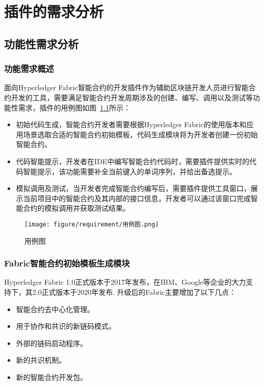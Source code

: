 \chapter{插件的需求分析}

\section{功能性需求分析}

\subsection{功能需求概述}

面向Hyperledger Fabric智能合约的开发插件作为辅助区块链开发人员进行智能合约开发的工具，需要满足智能合约开发周期涉及的创建、编写、调用以及测试等功能性需求，插件的用例图如图~\ref{fig:3.1}所示：

\begin{itemize}
  \item 初始代码生成，智能合约开发者需要根据Hyperledger Fabric的使用版本和应用场景选取合适的智能合约初始模板，代码生成模块将为开发者创建一份初始智能合约。
  \item 代码智能提示，开发者在IDE中编写智能合约代码时，需要插件提供实时的代码智能提示，该功能需要补全当前键入的单词序列，并给出备选提示。
  \item 模拟调用及测试，当开发者完成智能合约编写后，需要插件提供工具窗口，展示当前项目中的智能合约及其内部的接口信息，开发者可以通过该窗口完成智能合约的模拟调用并获取测试结果。
\end{itemize}

\begin{figure}[htb]
  \centering
  \texttt{[image: figure/requirement/用例图.png]}
  \caption{用例图}\label{fig:3.1}
\end{figure}

\subsection{Fabric智能合约初始模板生成模块}

Hyperledger Fabric 1.0正式版本于2017年发布，在IBM、Google等企业的大力支持下，其2.0正式版本于2020年发布.
升级后的Fabric主要增加了以下几点：

\begin{itemize}
  \item 智能合约去中心化管理。
  \item 用于协作和共识的新链码模式。
  \item 外部的链码启动程序。
  \item 新的共识机制。
  \item 新的智能合约开发包。
\end{itemize}

